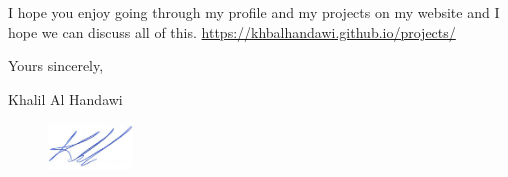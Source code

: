 \documentclass[12pt]{article} %
\begin{document}
I hope you enjoy going through my profile and my projects on my website and I hope we can discuss all of this. \href{https://khbalhandawi.github.io/projects/}{https://khbalhandawi.github.io/projects/}


\medskip %

Yours sincerely,

\medskip %

Khalil Al Handawi

\begin{figure}[h]
	\includegraphics[width=0.2\textwidth]{Signiture.png}
\end{figure}

\medskip %

\end{document}
